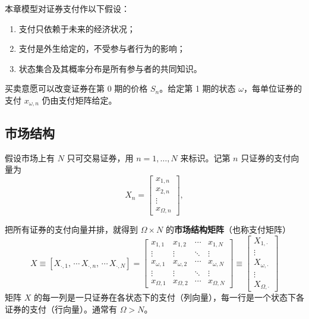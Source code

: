 本章模型对证券支付作以下假设：
    \begin{enumerate}
        \item 支付只依赖于未来的经济状况；
        \item 支付是外生给定的，不受参与者行为的影响；
        \item 状态集合及其概率分布是所有参与者的共同知识。
    \end{enumerate}

买卖意愿可以改变证券在第 0 期的价格 $S_n$。给定第 1 期的状态 $\omega$，每单位证券的支付 $x_{\omega,n}$ 仍由支付矩阵给定。

\subsection{市场结构}
假设市场上有 $N$ 只可交易证券，用 $n=1,\dots,N$ 来标识。记第 $n$ 只证券的支付向量为
    \[
        X_n=\begin{bmatrix}x_{1,n} \\ x_{2,n} \\ \vdots \\ x_{\Omega,n}\end{bmatrix},
    \]
    \begin{tcolorbox}[knowledge,title=支付矩阵与行列约定]
把所有证券的支付向量并排，就得到 $\Omega\times N$ 的\textbf{市场结构矩阵}（也称支付矩阵）
    \[
        X\equiv[X_{\cdot,1},\,\cdots\,X_{\cdot,n},\,\cdots\,X_{\cdot,N}]=
        \begin{bmatrix}
            x_{1,1}   & x_{1,2}   & \cdots & x_{1,N}   \\
            \vdots    & \vdots    & \ddots & \vdots    \\
            x_{\omega,1}   & x_{\omega,2}   & \cdots & x_{\omega,N}   \\
            \vdots    & \vdots    & \ddots & \vdots    \\
            x_{\Omega,1} & x_{\Omega,2} & \cdots & x_{\Omega,N}
        \end{bmatrix}\equiv
        \begin{bmatrix}
            X_{1,\cdot} \\ \vdots \\ X_{\omega,\cdot} \\ \vdots \\ X_{\Omega,\cdot}
        \end{bmatrix}
    \]
    矩阵 $X$ 的每一列是一只证券在各状态下的支付（列向量），每一行是一个状态下各证券的支付（行向量）。通常有 $\Omega>N$。
\end{tcolorbox}

